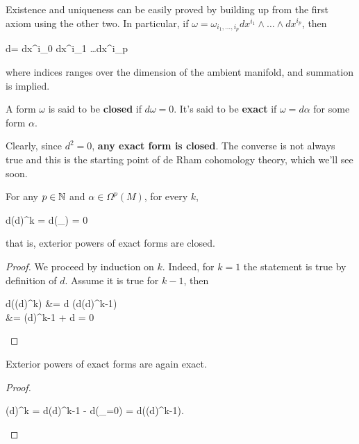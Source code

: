 \documentclass[main.tex]{subfiles}
\begin{document}
Existence and uniqueness can be easily proved by building up from the first axiom using the other two. In particular, if $\omega = \omega_{i_1, \ldots, i_p} dx^{i_1} \wedge \ldots \wedge dx^{i_p}$, then
\begin{eqalign}
	d\omega =  dx^{i_0} \wedge dx^{i_1} \wedge \ldots \wedge dx^{i_p}
\end{eqalign}
where indices ranges over the dimension of the ambient manifold, and summation is implied.

\begin{definition}
	A form $\omega$ is said to be \textbf{closed} if $d\omega = 0$. It's said to be \textbf{exact} if $\omega = d\alpha$ for some form $\alpha$.
\end{definition}

Clearly, since $d^2 = 0$, \textbf{any exact form is closed}. The converse is not always true and this is the starting point of de Rham cohomology theory, which we'll see soon.

\begin{lemma}
\label{lemma:der_of_ext_power}
	For any $p \in \mathbb{N}$ and $\alpha \in \Omega^p(M)$, for every $k$,
	\begin{eqalign}
		d(d\alpha)^{\wedge k} = d(_{}) = 0
	\end{eqalign}
	that is, exterior powers of exact forms are closed.
\end{lemma}
\begin{proof}
	We proceed by induction on $k$. Indeed, for $k=1$ the statement is true by definition of $d$. Assume it is true for $k-1$, then
	\begin{eqalign}
		d\left((d\alpha\right)^{\wedge k}) &= d \left(d\alpha \wedge (d\alpha)^{\wedge k-1}\right)\\
		&=  \wedge (d\alpha)^{k-1} + d\alpha \wedge \cancel{d\left(d\alpha^{\wedge k-1}\right)} = 0
	\end{eqalign}
\end{proof}
\begin{corollary}
\label{cor:ext_power_is_exact}
	Exterior powers of exact forms are again exact.
\end{corollary}
\begin{proof}
	\begin{eqalign}
		(d\alpha)^{\wedge k} = d\alpha \wedge (d\alpha)^{\wedge k-1} - \alpha \wedge d(_{=0}) = d\left(\alpha \wedge (d\alpha)^{\wedge k-1}\right).
	\end{eqalign}
\end{proof}
\end{document}
